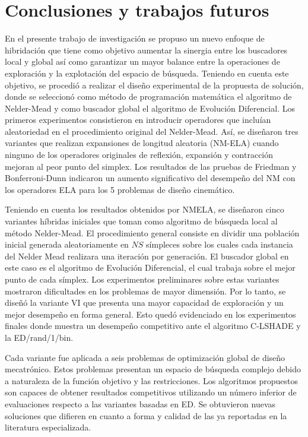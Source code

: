 \chapter{Conclusiones y trabajos futuros} \label{Chapter8}
En el presente trabajo de investigación se propuso un nuevo enfoque de hibridación que tiene como objetivo aumentar la sinergia entre los buscadores local y global así como garantizar un mayor balance entre la operaciones de exploración y la explotación del espacio de búsqueda. Teniendo en cuenta este objetivo, se procedió a realizar el diseño experimental de la propuesta de solución, donde se seleccionó como método de programación matemática el algoritmo de Nelder-Mead y como buscador global el algoritmo de Evolución Diferencial. Los primeros experimentos consistieron en introducir operadores que incluían aleatoriedad en el procedimiento original del Nelder-Mead. Así, se diseñaron tres variantes que realizan expansiones de longitud aleatoria (NM-ELA) cuando ninguno de los operadores originales de reflexión, expansión y contracción mejoran al peor punto del simplex. Los resultados de las pruebas de Friedman y Bonferroni-Dunn indicaron un aumento significativo del desempeño del NM con los operadores ELA para los 5 problemas de diseño cinemático. 

Teniendo en cuenta los resultados obtenidos por NMELA, se diseñaron cinco variantes híbridas iniciales que toman como algoritmo de búsqueda local al método Nelder-Mead. El procedimiento general consiste en dividir una población inicial generada aleatoriamente en $NS$ símpleces sobre los cuales cada instancia del Nelder Mead realizara una iteración por generación. El buscador global en este caso es el algoritmo de Evolución Diferencial, el cual trabaja sobre el mejor punto de cada símplex. Los experimentos preliminares sobre estas variantes mostraron dificultades en los problemas de mayor dimensión. Por lo tanto, se diseñó la variante VI que presenta una mayor capacidad de exploración y un mejor desempeño en forma general. Esto quedó evidenciado en los experimentos finales donde muestra un desempeño competitivo ante el algoritmo C-LSHADE y la ED/rand/1/bin.

Cada variante fue aplicada a seis problemas de optimización global de diseño mecatrónico. Estos problemas presentan un espacio de búsqueda complejo debido a naturaleza de la función objetivo y las restricciones. Los algoritmos propuestos son capaces de obtener resultados competitivos utilizando un número inferior de evaluaciones respecto a las variantes basadas en ED. Se obtuvieron nuevas soluciones que difieren en cuanto a forma y calidad de las ya reportadas en la literatura especializada. 


